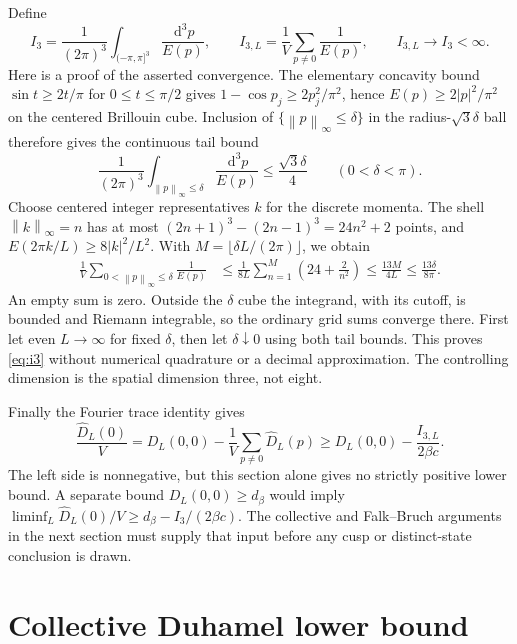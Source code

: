 \documentclass[11pt]{article}
\numberwithin{equation}{section}
\theoremstyle{definition}
\newcommand{\dd}{\,\mathrm d}
\newcommand{\norm}[1]{\left\lVert#1\right\rVert}
\begin{document}
Define
\begin{equation}
 I_3=\frac1{(2\pi)^3}\int_{(-\pi,\pi]^3}\frac{\dd^3p}{E(p)},\qquad
 I_{3,L}=\frac1V\sum_{p\neq0}\frac1{E(p)},\qquad I_{3,L}\to I_3<\infty.
 \label{eq:i3}
\end{equation}
Here is a proof of the asserted convergence.  The elementary concavity
bound $\sin t\geq2t/\pi$ for $0\leq t\leq\pi/2$ gives
$1-\cos p_j\geq2p_j^2/\pi^2$, hence
$E(p)\geq2|p|^2/\pi^2$ on the centered Brillouin cube.  Inclusion of
$\{\norm p_\infty\leq\delta\}$ in the radius-$\sqrt3\delta$ ball
therefore gives the continuous tail bound
\begin{equation}
 \frac1{(2\pi)^3}\int_{\norm p_\infty\leq\delta}\frac{\dd^3p}{E(p)}
 \leq\frac{\sqrt3\delta}{4}\qquad(0<\delta<\pi).
 \label{eq:infrared-continuous-tail}
\end{equation}
Choose centered integer representatives $k$ for the discrete momenta.  The
shell $\norm k_\infty=n$ has at most
$(2n+1)^3-(2n-1)^3=24n^2+2$ points, and
$E(2\pi k/L)\geq8|k|^2/L^2$.  With
$M=\lfloor\delta L/(2\pi)\rfloor$, we obtain
\begin{align}
 \frac1V\sum_{0<\norm p_\infty\leq\delta}\frac1{E(p)}
 &\leq\frac1{8L}\sum_{n=1}^{M}\left(24+\frac2{n^2}\right)
 \leq\frac{13M}{4L}\leq\frac{13\delta}{8\pi}.
 \label{eq:infrared-discrete-tail}
\end{align}
An empty sum is zero.  Outside the $\delta$ cube the integrand, with its
cutoff, is bounded and Riemann integrable, so the ordinary grid sums
converge there.  First let even $L\to\infty$ for fixed $\delta$, then
let $\delta\downarrow0$ using both tail bounds.  This proves
\eqref{eq:i3} without numerical quadrature or a decimal approximation.
The controlling dimension is the spatial dimension three, not eight.

Finally the Fourier trace identity gives
\begin{equation}
 \frac{\widehat D_L(0)}V
 =D_L(0,0)-\frac1V\sum_{p\neq0}\widehat D_L(p)
 \geq D_L(0,0)-\frac{I_{3,L}}{2\beta c}.
 \label{eq:infrared-subtraction}
\end{equation}
The left side is nonnegative, but this section alone gives no strictly
positive lower bound.  A separate bound $D_L(0,0)\geq d_\beta$ would
imply $\liminf_L\widehat D_L(0)/V\geq d_\beta-I_3/(2\beta c)$.
The collective and Falk--Bruch arguments in the next section must supply
that input before any cusp or distinct-state conclusion is drawn.

\section{Collective Duhamel lower bound}
\label{sec:collective}
\end{document}
